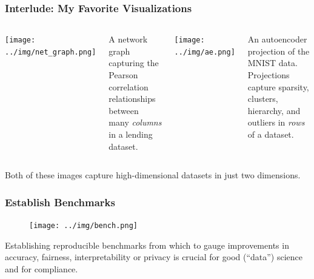 \documentclass[11pt,
               aspectratio=169,
               hyperref={colorlinks}
               ]{beamer}
\begin{document}
			\begin{frame}

				\frametitle{Interlude: My Favorite Visualizations}		
			
				\vspace{-15pt}
			
				\begin{columns}
	
					\centering
					\texttt{[image: ../img/net\_graph.png]}
					
					\tiny{A network graph capturing the Pearson correlation relationships between many \textit{columns} in a lending dataset.}
				
					
					\vspace{19pt}
					\centering
					\texttt{[image: ../img/ae.png]}
					
					\vspace{19pt}
					
					\tiny{An autoencoder projection of the MNIST data. Projections capture sparsity, clusters, hierarchy, and outliers in \textit{rows} of a dataset.}
				
				\end{columns}
			
				\vspace{10pt}
			
				\centering
				\footnotesize{Both of these images capture high-dimensional datasets in just two dimensions.}
		
			\end{frame}
	
			\begin{frame}
			
				\frametitle{Establish Benchmarks}		
	
				\begin{figure}[htb]
					\begin{center}
						\texttt{[image: ../img/bench.png]}
					\end{center}
				\end{figure}	
	
				\vspace{-10pt}
				\scriptsize{Establishing reproducible benchmarks from which to gauge improvements in accuracy, fairness, interpretability or privacy is crucial for good (``data'') science and for compliance. }
			
			\end{frame}
	
\end{document}
